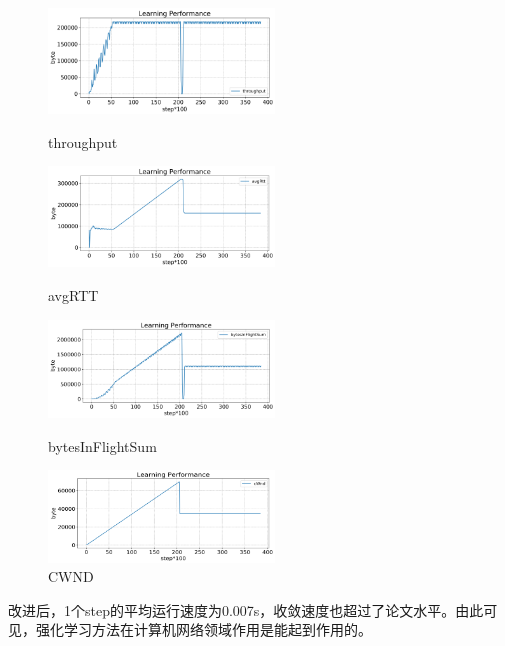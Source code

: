 \begin{figure}[htbp]
\centering
\begin{minipage}[t]{0.48\textwidth}
\centering
\includegraphics[width=6cm]{figure/figure9.png}
\caption{throughput}
\end{minipage}
\begin{minipage}[t]{0.48\textwidth}
\centering
\includegraphics[width=6cm]{figure/figure10.png}
\caption{avgRTT}
\end{minipage}
\centering
\begin{minipage}[t]{0.48\textwidth}
\centering
\includegraphics[width=6cm]{figure/figure11.png}
\caption{bytesInFlightSum}
\end{minipage}
\begin{minipage}[t]{0.48\textwidth}
\centering
\includegraphics[width=6cm]{figure/figure12.png}
\caption{CWND}
\end{minipage}
\end{figure}

改进后，1个step的平均运行速度为0.007s，收敛速度也超过了论文水平。由此可见，强化学习方法在计算机网络领域作用是能起到作用的。
